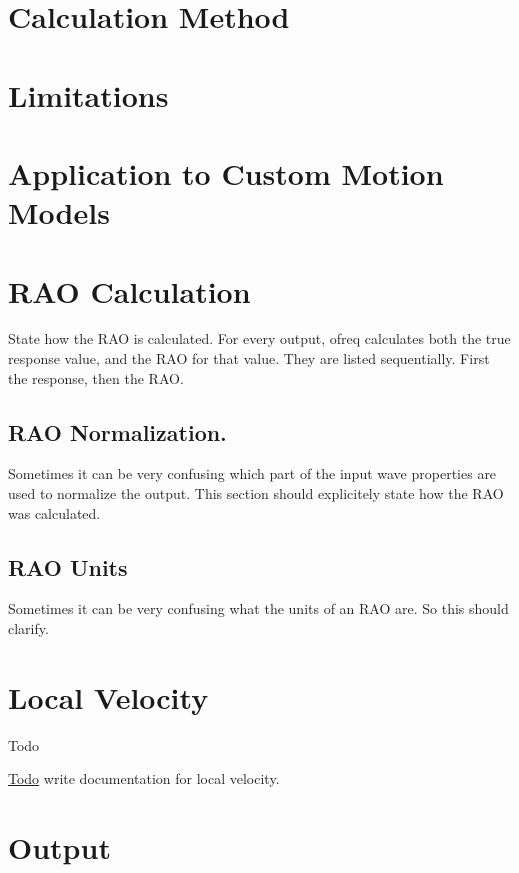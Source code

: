 \section*{Calculation Method}

\section*{Limitations}

\section*{Application to Custom Motion Models}

\section*{R\-A\-O Calculation}

State how the R\-A\-O is calculated. For every output, ofreq calculates both the true response value, and the R\-A\-O for that value. They are listed sequentially. First the response, then the R\-A\-O.

\subsection*{R\-A\-O Normalization.}

Sometimes it can be very confusing which part of the input wave properties are used to normalize the output. This section should explicitely state how the R\-A\-O was calculated.

\subsection*{R\-A\-O Units}

Sometimes it can be very confusing what the units of an R\-A\-O are. So this should clarify. \hypertarget{local_velocity}{}\section{Local Velocity}\label{local_velocity}
\begin{DoxyRefDesc}{Todo}
\item[\hyperlink{todo__todo000029}{Todo}]write documentation for local velocity.\end{DoxyRefDesc}


\section*{Output}

